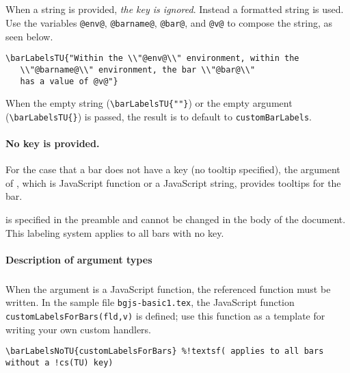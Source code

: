\documentclass{article}
\edef\amtIndent{\the\parindent}
\begin{document}
\subparagraph*{} When a string is provided, \emph{the
 key is ignored}. Instead a formatted string is used.
Use the variables \texttt{@env@}, \texttt{@barname@}, \texttt{@bar@}, and
\texttt{@v@} to compose the string, as seen below.
\begin{Verbatim}[xleftmargin=\amtIndent,fontsize=\small]
 \barLabelsTU{"Within the \\"@env@\\" environment, within the
   \\"@barname@\\" environment, the bar \\"@bar@\\"
   has a value of @v@"}
\end{Verbatim}
When the empty string (\verb|\barLabelsTU{""}|) or the empty argument
(\verb|\barLabelsTU{}|) is passed, the result is to default to
\texttt{customBarLabels}.

\paragraph*{No  key is provided.}
For the case that a bar does not have a  key (no tooltip specified),
the argument of , which is JavaScript function or a
JavaScript string, provides tooltips for the bar.
\bVerb{}%
\begin{dCmd}[commandchars=!()]{\bxSize}
\end{dCmd}
\eVerb {} is specified in the preamble and cannot be changed in the body of the
    document. This labeling system applies to all bars with no  key.
\paragraph*{Description of argument types}
\subparagraph*{} When the argument is a JavaScript
     function, the referenced function must be written. In the sample file
     \texttt{bgjs-basic1.tex}, the JavaScript function \texttt{customLabelsForBars(fld,v)} is defined;
     use this function as a template for writing your own custom handlers.
\begin{Verbatim}[xleftmargin=\amtIndent,fontsize=\small,commandchars=!()]
\barLabelsNoTU{customLabelsForBars} %!textsf( applies to all bars without a !cs(TU) key)
\end{Verbatim}
\end{document}
